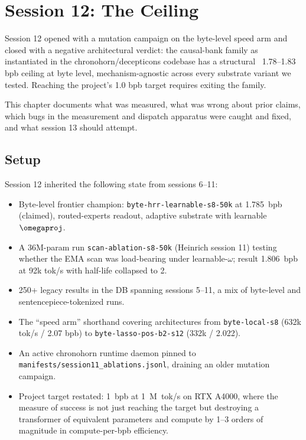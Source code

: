 \chapter{Session 12: The Ceiling}
\label{ch:session12}

Session 12 opened with a mutation campaign on the byte-level speed arm and closed with a negative architectural verdict: the causal-bank family as instantiated in the chronohorn/decepticons codebase has a structural ~1.78--1.83 bpb ceiling at byte level, mechanism-agnostic across every substrate variant we tested. Reaching the project's 1.0 bpb target requires exiting the family.

This chapter documents what was measured, what was wrong about prior claims, which bugs in the measurement and dispatch apparatus were caught and fixed, and what session 13 should attempt.

\section{Setup}

Session 12 inherited the following state from sessions 6--11:
\begin{itemize}
  \item Byte-level frontier champion: \texttt{byte-hrr-learnable-s8-50k} at 1.785~bpb (claimed), routed-experts readout, adaptive substrate with learnable $\omegaproj$.
  \item A 36M-param run \texttt{scan-ablation-s8-50k} (Heinrich session 11) testing whether the EMA scan was load-bearing under learnable-$\omega$; result 1.806~bpb at 92k tok/s with half-life collapsed to 2.
  \item 250+ legacy results in the DB spanning sessions 5--11, a mix of byte-level and sentencepiece-tokenized runs.
  \item The ``speed arm'' shorthand covering architectures from \texttt{byte-local-s8} (632k tok/s / 2.07 bpb) to \texttt{byte-lasso-pos-b2-s12} (332k / 2.022).
  \item An active chronohorn runtime daemon pinned to \texttt{manifests/session11\_ablations.jsonl}, draining an older mutation campaign.
  \item Project target restated: 1~bpb at 1~M~tok/s on RTX A4000, where the measure of success is not just reaching the target but destroying a transformer of equivalent parameters and compute by 1--3 orders of magnitude in compute-per-bpb efficiency.
\end{itemize}

